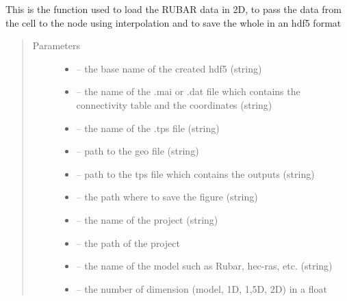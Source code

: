 \documentclass[letterpaper,10pt,english]{sphinxmanual}
\begin{document}
\begin{fulllineitems}
\label{\detokenize{index:src.rubar.load_rubar2d_and_create_grid}}
This is the function used to load the RUBAR data in 2D, to pass the data from the cell to the node using
interpolation and to save the whole in an hdf5 format
\begin{quote}\begin{description}
\item[{Parameters}] \leavevmode\begin{itemize}
\item {} 
 -- the base name of the created hdf5 (string)

\item {} 
 -- the name of the .mai or .dat file which contains the connectivity table and the coordinates (string)

\item {} 
 -- the name of the .tps file (string)

\item {} 
 -- path to the geo file (string)

\item {} 
 -- path to the tps file which contains the outputs (string)

\item {} 
 -- the path where to save the figure (string)

\item {} 
 -- the name of the project (string)

\item {} 
 -- the path of the project

\item {} 
 -- the name of the model such as Rubar, hec-ras, etc. (string)

\item {} 
 -- the number of dimension (model, 1D, 1,5D, 2D) in a float


\end{itemize}
\end{description}
\end{quote}
\end{fulllineitems}
\end{document}
